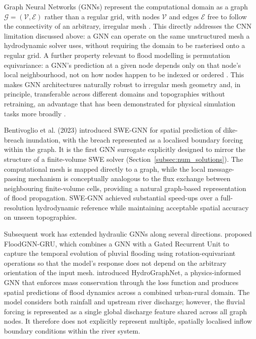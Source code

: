 \documentclass[12pt,a4paper]{report}
\begin{document}
Graph Neural Networks (GNNs) represent the computational domain as a graph
$\mathcal{G} = (\mathcal{V}, \mathcal{E})$ rather than a regular grid, with nodes
$\mathcal{V}$ and edges $\mathcal{E}$ free to follow the connectivity of an arbitrary,
irregular mesh \citep{bronstein2021geometric}. This directly addresses the CNN
limitation discussed above: a GNN can operate on the same unstructured mesh a
hydrodynamic solver uses, without requiring the domain to be rasterised onto a regular
grid. A further property relevant to flood modelling is permutation equivariance: a
GNN's prediction at a given node depends only on that node's local neighbourhood, not on
how nodes happen to be indexed or ordered \citep{bronstein2021geometric}.
This makes GNN
architectures naturally robust to irregular mesh geometry and, in principle, transferable
across different domains and topographies without retraining, an advantage that has been
demonstrated for physical simulation tasks more broadly
\citep{sanchezgonzalez2020learning}.
 
Bentivoglio et al. (2023) introduced SWE-GNN for spatial prediction of dike-breach inundation, with the breach represented as a localised boundary forcing within the graph. It is the first GNN surrogate explicitly designed to mirror the structure of a finite-volume SWE solver (Section~\ref{subsec:num_solutions}). The computational mesh is mapped directly to a graph, while the local message-passing mechanism is conceptually analogous to the flux exchange between neighbouring finite-volume cells, providing a natural graph-based representation of flood propagation. SWE-GNN achieved substantial speed-ups over a full-resolution hydrodynamic reference while maintaining acceptable spatial accuracy on unseen topographies.

 
Subsequent work has extended hydraulic GNNs along several directions.
\citet{kazadi2024floodgnngru} proposed FloodGNN-GRU, which combines a GNN with a Gated
Recurrent Unit to capture the temporal evolution of pluvial flooding  using rotation-equivariant operations so that the model's response does not depend on the arbitrary orientation of the
input mesh. \citet{taghizadeh2025hydrographnet} introduced HydroGraphNet, a physics-informed GNN that enforces mass conservation through the loss function and produces spatial predictions of flood dynamics across a combined urban-rural domain. The model considers both rainfall and upstream river discharge; however, the fluvial forcing is represented as a single global discharge feature shared across all graph nodes. It therefore does not explicitly represent multiple, spatially localised inflow boundary conditions within the river system.
\end{document}
